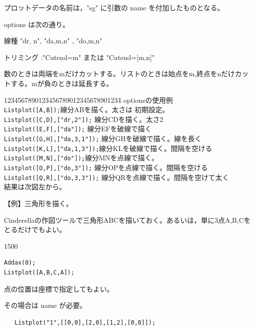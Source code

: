\documentclass[papersize,a4paper,10pt,uplatex]{jsarticle}
\begin{document}
\begin{description}
プロットデータの名前は，"sg" に引数の name を付加したものとなる。

 options は次の通り。

線種 "dr, n", "da,m,n" , "do,m,n"

トリミング :"Cutend=m" または "Cutend=[m,n]" 

数のときは両端をmだけカットする。リストのときは始点をm,終点をnだけカットする。mが負のときは延長する。

\begin{tabbing}
1234567890123456789012345678901234\=\kill
optionsの使用例\\
\verb|Listplot([A,B]);|\>線分ABを描く。太さは 初期設定。\\
\verb|Listplot([C,D],["dr,2"]);| \>線分CDを描く。太さ2\\
\verb|Listplot([E,F],["da"]);| \>線分EFを破線で描く\\
\verb|Listplot([G,H],["da,3,1"]);| \>線分GHを破線で描く。線を長く\\
\verb|Listplot([K,L],["da,1,3"]);|\>線分KLを破線で描く。間隔を空ける\\
\verb|Listplot([M,N],["do"]);|\>線分MNを点線で描く。\\
\verb|Listplot([O,P],["do,3"]);| \>線分OPを点線で描く。間隔を空ける\\
\verb|Listplot([Q,R],["do,3,3"]);| \>線分QRを点線で描く。間隔を空けて太く\\
結果は次図左から。
\end{tabbing}
\begin{center} \scalebox{0.9}{}\end{center}

\newpage

【例】三角形を描く。

Cinderellaの作図ツールで三角形ABCを描いておく。あるいは，単に3点A,B,Cをとるだけでもよい。

\begin{layer}{150}{0}
\end{layer}
\hspace{20mm}

\begin{verbatim}
Addax(0);
Listplot([A,B,C,A]);
\end{verbatim}

点の位置は座標で指定してもよい。

その場合は name が必要。

\verb|   Listplot("1",[[0,0],[2,0],[1,2],[0,0]]);|


\end{description}
\end{document}
